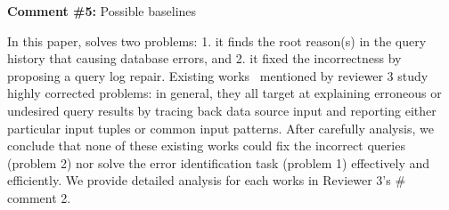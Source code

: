 


\comskip

\noindent
\textbf{Comment \#5:} Possible baselines
\begin{quote}
\end{quote}

In this paper, \sys solves two problems: 1. it finds the root reason(s) in the
query history that causing database errors, and 2. it fixed the incorrectness
by proposing a query log repair. Existing works~\cite{Wu13, roy2014formal,
chalamalla2014,meliou2011tracing} mentioned by reviewer 3 study highly
corrected problems: in general, they all target at explaining erroneous or
undesired query results by tracing back data source input and reporting either
particular input tuples or common input patterns. After carefully analysis, we
conclude that none of these existing works could fix the incorrect queries
(problem 2) nor solve the error identification task (problem 1) effectively
and efficiently. We provide detailed analysis for each works in Reviewer 3's
\# comment 2.
